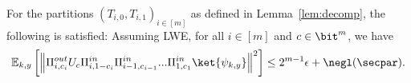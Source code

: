\begin{lemma}\label{lem:decomp2}
For the partitions $(T_{i,0},T_{i,1})_{i\in[m]}$ as defined in Lemma~\ref{lem:decomp}, the following is satisfied:
Assuming LWE, for all $i\in[m]$ and $c\in \bit^{m}$, we have 
    \begin{align*}
     \mathbb{E}_{k,y}\left[\left\|\Pi_{i,c_i}^{out}U_c\Pi_{i,1-c_i}^{in}\Pi_{i-1,c_{i-1}}^{in}...\Pi_{1,c_1}^{in}\ket{\psi_{k,y}}\right\|^2\right]\leq  2^{m-1}\epsilon +\negl(\secpar).
    \end{align*}
    
\end{lemma}

